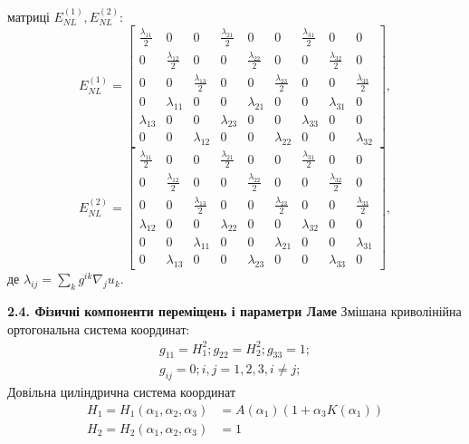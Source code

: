 \documentclass[10pt,a4paper]{article}
\numberwithin{figure}{section}
\numberwithin{equation}{section}
\begin{document}
матриці $E_{NL}^{(1)}, E_{NL}^{(2)}$:
\begin{equation}
E_{NL}^{(1)}=\left[\begin{matrix}
\frac{\lambda_{11}}{2} & 0 & 0 & \frac{\lambda_{21}}{2} & 0 & 0 & \frac{\lambda_{31}}{2} & 0 & 0\\
0 & \frac{\lambda_{12}}{2} & 0 & 0 & \frac{\lambda_{22}}{2} & 0 & 0 & \frac{\lambda_{32}}{2} & 0\\
0 & 0 & \frac{\lambda_{13}}{2} & 0 & 0 & \frac{\lambda_{23}}{2} & 0 & 0 & \frac{\lambda_{33}}{2}\\
0 & \lambda_{11} & 0 & 0 & \lambda_{21} & 0 & 0 & \lambda_{31} & 0\\
\lambda_{13} & 0 & 0 & \lambda_{23} & 0 & 0 & \lambda_{33} & 0 & 0\\
0 & 0 & \lambda_{12} & 0 & 0 & \lambda_{22} & 0 & 0 & \lambda_{32}
\end{matrix}\right],
\end{equation}
\begin{equation}
E_{NL}^{(2)}=\left[\begin{matrix}
\frac{\lambda_{11}}{2} & 0 & 0 & \frac{\lambda_{21}}{2} & 0 & 0 & \frac{\lambda_{31}}{2} & 0 & 0\\
0 & \frac{\lambda_{12}}{2} & 0 & 0 & \frac{\lambda_{22}}{2} & 0 & 0 & \frac{\lambda_{32}}{2} & 0\\
0 & 0 & \frac{\lambda_{13}}{2} & 0 & 0 & \frac{\lambda_{23}}{2} & 0 & 0 & \frac{\lambda_{33}}{2}\\
\lambda_{12} & 0 & 0 & \lambda_{22} & 0 & 0 & \lambda_{32} & 0 & 0\\
0 & 0 & \lambda_{11} & 0 & 0 & \lambda_{21} & 0 & 0 & \lambda_{31}\\
0 & \lambda_{13} & 0 & 0 & \lambda_{23} & 0 & 0 & \lambda_{33} & 0
\end{matrix}\right],
\end{equation}
де
$ \lambda_{ij}=\sum_k g^{ik}\nabla_j u_k $.

\textbf{2.4. Фізичні компоненти переміщень і параметри Ламе}
\linebreak
\linebreak
Змішана криволінійна ортогональна система координат:
\begin{align}
g_{11}=H_1^2; g_{22}=H_2^2; g_{33}=1; \\
g_{ij}=0; i,j=1,2,3, i \ne j;
\end{align}
Довільна циліндрична система координат
\begin{align}
H_1 = H_1 \left( \alpha_1, \alpha_2, \alpha_3 \right) &= A \left( \alpha_1 \right) \left( 1+ \alpha_3 K \left( \alpha_1 \right) \right)  \\
H_2 = H_2 \left( \alpha_1, \alpha_2, \alpha_3 \right) &= 1
\end{align}
\end{document}

